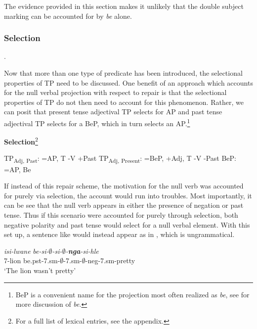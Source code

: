 \documentclass[output=paper]{langsci/langscibook}
\newcommand{\bee}[0]{\textit{be }}
\begin{document}
{\begin{exe}
\end{exe}

The evidence provided in this section makes it unlikely that the double subject marking can be accounted for by \bee alone. 



\subsubsection{Selection}. 

Now that more than one type of predicate has been introduced, the selectional properties of TP need to be discussed. One benefit of an approach which accounts for the null verbal projection with respect to repair is that the selectional properties of TP do not then need to account for this phenomenon. Rather, we can posit that present tense adjectival TP selects for AP and past tense adjectival TP selects for a BeP, which in turn selects an AP.\footnote{BeP is a convenient name for the projection most often realized as \textit{be}, see  for more discussion of \textit{be}.}


\textbf{Selection}\footnote{For a full list of lexical entries, see the appendix.}
\begin{exe}
\ex TP\textsubscript{Adj, Past}: =AP, T -V +Past
\ex TP\textsubscript{Adj, Present}: =BeP, +Adj, T -V -Past
\ex BeP: =AP, Be 
\end{exe}

If instead of this repair scheme, the motivation for the null verb was accounted for purely via selection, the account would run into troubles. Most importantly, it can be see that the null verb appears in either the presence of negation or past tense. Thus if this scenario were accounted for purely through selection, both negative polarity and past tense would select for a null verbal element. With this set up, a sentence like  would instead appear as in , which is ungrammatical.

\begin{exe}
\ex \gll *\textit{isi-lwane} \textit{be-si-$\emptyset$-si-$\emptyset$-{\bf nga}-si-hle}\\
       7-lion be.{\sc pst}-7.{\sc sm}-$\emptyset$-7.{\sc sm}-$\emptyset$-{\sc neg}-7.{\sc sm}-pretty\\
    \glt `The lion wasn't pretty' 
\end{exe}

}
\end{document}

